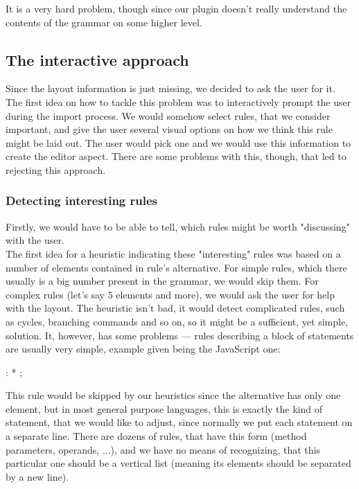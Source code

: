 It is a very hard problem, though since our plugin doesn't really understand the contents of the grammar on some higher level.

\subsection{The interactive approach}

Since the layout information is just missing, we decided to ask the user for it.
The first idea on how to tackle this problem was to interactively prompt the user during the import process.
We would somehow select rules, that we consider important, and give the user several visual options on how we think this rule might be laid out.
The user would pick one and we would use this information to create the editor aspect.
There are some problems with this, though, that led to rejecting this approach.

\subsubsection{Detecting interesting rules}

Firstly, we would have to be able to tell, which rules might be worth "discussing" with the user.
\\

The first idea for a heuristic indicating these "interesting" rules was based on a number of elements contained in rule's alternative.
For simple rules, which there usually is a big number present in the grammar, we would skip them.
For complex rules (let's say 5 elements and more), we would ask the user for help with the layout.
The heuristic isn't bad, it would detect complicated rules, such as cycles, branching commands and so on, so it might be a sufficient, yet simple, solution.
It, however, has some problems --- rules describing a block of statements are usually very simple, example given being the JavaScript one:

\begin{antlr}
	 : * ;
\end{antlr}

This rule would be skipped by our heuristics since the alternative has only one element, but in most general purpose languages, this is exactly the kind of statement, that we would like to adjust, since normally we put each statement on a separate line.
There are dozens of rules, that have this form (method parameters, operands, ...), and we have no means of recognizing, that this particular one should be a vertical list (meaning its elements should be separated by a new line).
\\


